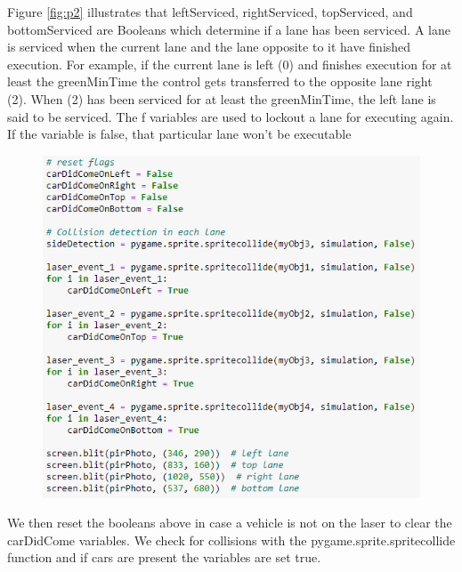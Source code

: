 \documentclass[12pt, a4paper,titlepage]{article}
\begin{document}
Figure \ref{fig:p2} illustrates that leftServiced, rightServiced, topServiced, and bottomServiced are Booleans which determine if a lane has been serviced. A lane is serviced when the current lane and the lane opposite to it have finished execution. For example, if the current lane is left (0) and finishes execution for at least the greenMinTime the control gets transferred to the opposite lane right (2). When (2) has been serviced for at least the greenMinTime,  the left lane is said to be serviced. The f variables are used to lockout a lane for executing again. If the variable is false, that particular lane won’t be executable

\begin{figure}[H]
	\centering
	\includegraphics[width=\linewidth]{images/p3}
	\caption{}
	\label{fig:p3}
\end{figure}

We then reset the booleans above in case a vehicle is not on the laser to clear the carDidCome variables. We check for collisions with the pygame.sprite.spritecollide function and if cars are present the variables are set true.
\end{document}
